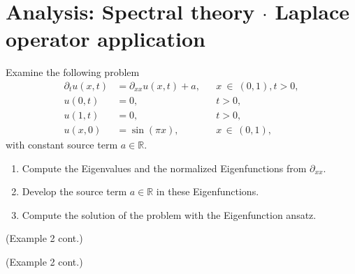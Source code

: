 \documentclass[12pt]{article}
\begin{document}
\section{Analysis: Spectral theory $\cdot$ Laplace operator application}
\newpage
\begin{example}
	Examine the following problem
	\begin{align*}
		\partial_t u(x,t) & =\partial_{xx}u(x,t)+a, &  & x\ \in\ (0,1), t>0, \\
		u(0,t)            & =0,                     &  & t>0,                \\
		u(1,t)            & =0,                     &  & t>0,                \\
		u(x,0)            & = \sin(\pi x),          &  & x\, \in\, (0,1) ,
	\end{align*}
	with constant source term $a\in\mathbb{R}$.
	\begin{enumerate}
		\item Compute the Eigenvalues and the normalized Eigenfunctions from $\partial_{xx}$.
		\item Develop the source term $a\in\mathbb{R}$ in these Eigenfunctions.
		\item Compute the solution of the problem with the Eigenfunction ansatz.
	\end{enumerate}
\end{example}

\newpage
(Example 2 cont.)

\newpage
(Example 2 cont.)
\end{document}
